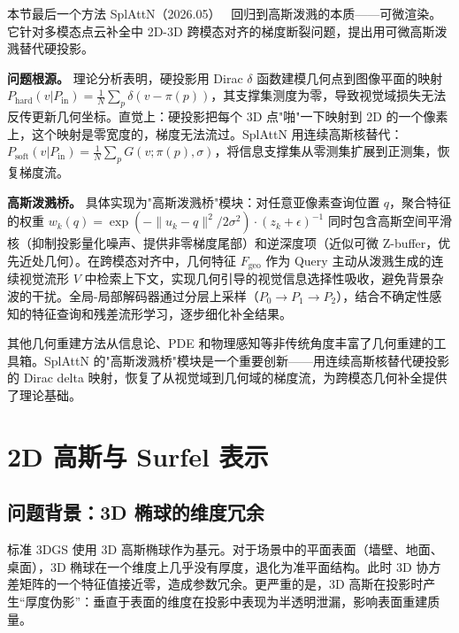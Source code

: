 本节最后一个方法 SplAttN（2026.05）~\cite{2605_01466} 回归到高斯泼溅的本质——可微渲染。它针对多模态点云补全中 2D-3D 跨模态对齐的梯度断裂问题，提出用可微高斯泼溅替代硬投影。

\textbf{问题根源。} 理论分析表明，硬投影用 Dirac $\delta$ 函数建模几何点到图像平面的映射 $P_{\text{hard}}(v|P_{\text{in}}) = \frac{1}{N}\sum_p \delta(v - \pi(p))$，其支撑集测度为零，导致视觉域损失无法反传更新几何坐标。直觉上：硬投影把每个 3D 点"啪"一下映射到 2D 的一个像素上，这个映射是零宽度的，梯度无法流过。SplAttN 用连续高斯核替代：$P_{\text{soft}}(v|P_{\text{in}}) = \frac{1}{N}\sum_p G(v; \pi(p), \sigma)$，将信息支撑集从零测集扩展到正测集，恢复梯度流。

\textbf{高斯泼溅桥。} 具体实现为"高斯泼溅桥"模块：对任意亚像素查询位置 $q$，聚合特征的权重 $w_k(q) = \exp(-\|u_k - q\|^2 / 2\sigma^2) \cdot (z_k + \epsilon)^{-1}$ 同时包含高斯空间平滑核（抑制投影量化噪声、提供非零梯度尾部）和逆深度项（近似可微 Z-buffer，优先近处几何）。在跨模态对齐中，几何特征 $F_{\text{geo}}$ 作为 Query 主动从泼溅生成的连续视觉流形 $V$ 中检索上下文，实现几何引导的视觉信息选择性吸收，避免背景杂波的干扰。全局-局部解码器通过分层上采样（$P_0 \to P_1 \to P_2$），结合不确定性感知的特征查询和残差流形学习，逐步细化补全结果。

\begin{takeaway}
其他几何重建方法从信息论、PDE 和物理感知等非传统角度丰富了几何重建的工具箱。SplAttN 的"高斯泼溅桥"模块是一个重要创新——用连续高斯核替代硬投影的 Dirac delta 映射，恢复了从视觉域到几何域的梯度流，为跨模态几何补全提供了理论基础。
\end{takeaway}


\section{2D 高斯与 Surfel 表示}
\label{sec:04_2dgs}

\subsection{问题背景：3D 椭球的维度冗余}

标准 3DGS 使用 3D 高斯椭球作为基元。对于场景中的平面表面（墙壁、地面、桌面），3D 椭球在一个维度上几乎没有厚度，退化为准平面结构。此时 3D 协方差矩阵的一个特征值接近零，造成参数冗余。更严重的是，3D 高斯在投影时产生“厚度伪影”：垂直于表面的维度在投影中表现为半透明泄漏，影响表面重建质量。


